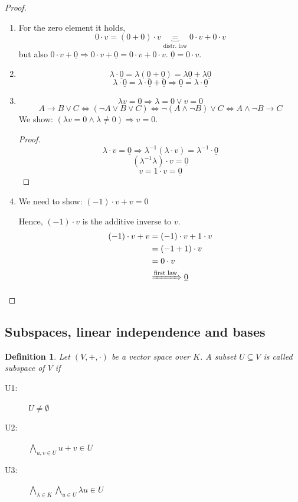 \documentclass[a4paper,landscape,twocolumn]{article}
\newtheorem{defi}{Definition}
\begin{document}
\begin{proof}
  \begin{enumerate}
    \item For the zero element it holds,
      \[ 0 \cdot v = (0 + 0) \cdot v \underbrace{=}_{\text{distr. law}} 0 \cdot v + 0 \cdot v \]
      but also $0 \cdot v + \underline{0} \Rightarrow 0 \cdot v + \underline{0} = 0\cdot v + 0\cdot v$.
      $\underline{0} = 0\cdot v$.
    \item
      \[ \lambda \cdot \underline{0} = \lambda (\underline{0} + \underline{0}) = \lambda \underline{0} + \lambda \underline{0} \]
      \[ \lambda \cdot \underline{0} = \lambda \cdot \underline{0} + \underline{0} \Rightarrow \underline{0} = \lambda \cdot \underline{0} \]
    \item
      \[ \lambda v = 0 \Rightarrow \lambda = 0 \lor v = 0 \]
      \[
          A \rightarrow B \lor C \Leftrightarrow (\neg A \lor B \lor C)
          \Leftrightarrow \neg(A \land \neg B) \lor C
          \Leftrightarrow A \land \neg B \rightarrow C
      \]
      We show: $(\lambda v = 0 \land \lambda \neq 0) \Rightarrow v = 0$.
      \begin{proof}
        \[ \lambda \cdot v = \underline{0} \Rightarrow \lambda^{-1}(\lambda \cdot v) = \lambda^{-1} \cdot \underline{0} \]
        \[ (\lambda^{-1} \lambda) \cdot v = \underline{0} \]
        \[ v = 1 \cdot v = \underline{0} \]
      \end{proof}
    \item We need to show: $(-1) \cdot v + v = 0$

      Hence, $(-1)\cdot v$ is the additive inverse to $v$.
      \begin{align*}
        (-1) \cdot v + v &= (-1) \cdot v + 1 \cdot v \\
            &= (-1 + 1) \cdot v \\
            &= 0 \cdot v \\
            &\xRightarrow{\text{first law}} \underline{0}
      \end{align*}
  \end{enumerate}
\end{proof}

\subsection{Subspaces, linear independence and bases}

\begin{defi}
  Let $(V, +, \cdot)$ be a vector space over $K$.
  A subset $U \subseteq V$ is called \emph{subspace of $V$} if
  \begin{description}
    \item[U1:] $U \neq \emptyset$
    \item[U2:] $\bigwedge_{u,v \in U} u + v \in U$
    \item[U3:] $\bigwedge_{\lambda \in K} \bigwedge_{u \in U} \lambda u \in U$
  \end{description}
\end{defi}
\end{document}
